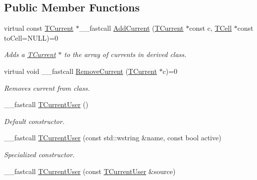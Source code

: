 \subsection*{Public Member Functions}
\begin{DoxyCompactItemize}
\item 
virtual const \hyperlink{class_t_current}{T\+Current} $\ast$\+\_\+\+\_\+fastcall \hyperlink{class_t_current_user_a79db0c0c69ec346073feb748f28717f4}{Add\+Current} (\hyperlink{class_t_current}{T\+Current} $\ast$const c, \hyperlink{class_t_cell}{T\+Cell} $\ast$const to\+Cell=N\+U\+L\+L)=0
\begin{DoxyCompactList}\small\item\em Adds a \hyperlink{class_t_current}{T\+Current} $\ast$ to the array of currents in derived class. \end{DoxyCompactList}\item 
virtual void \+\_\+\+\_\+fastcall \hyperlink{class_t_current_user_a957583067328b5a251b8d6cacb6ab279}{Remove\+Current} (\hyperlink{class_t_current}{T\+Current} $\ast$c)=0
\begin{DoxyCompactList}\small\item\em Removes current from class. \end{DoxyCompactList}\item 
\hypertarget{class_t_current_user_ae1c34202d2fe001c392fd1485ec4f3a1}{\+\_\+\+\_\+fastcall \hyperlink{class_t_current_user_ae1c34202d2fe001c392fd1485ec4f3a1}{T\+Current\+User} ()}\label{class_t_current_user_ae1c34202d2fe001c392fd1485ec4f3a1}

\begin{DoxyCompactList}\small\item\em Default constructor. \end{DoxyCompactList}\item 
\hypertarget{class_t_current_user_a6644613131515a0b0529b0c9e7facffb}{\+\_\+\+\_\+fastcall \hyperlink{class_t_current_user_a6644613131515a0b0529b0c9e7facffb}{T\+Current\+User} (const std\+::wstring \&name, const bool active)}\label{class_t_current_user_a6644613131515a0b0529b0c9e7facffb}

\begin{DoxyCompactList}\small\item\em Specialized constructor. \end{DoxyCompactList}\item 
\hypertarget{class_t_current_user_a7360161e482e0f8035df59402ac7ec13}{\+\_\+\+\_\+fastcall \hyperlink{class_t_current_user_a7360161e482e0f8035df59402ac7ec13}{T\+Current\+User} (const \hyperlink{class_t_current_user}{T\+Current\+User} \&source)}\label{class_t_current_user_a7360161e482e0f8035df59402ac7ec13}


\end{DoxyCompactItemize}
